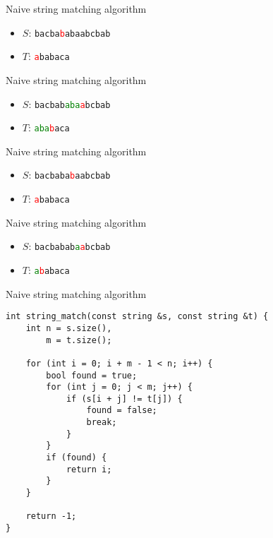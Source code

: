 \documentclass[12pt,t]{beamer}
\begin{document}
\begin{frame}{Naive string matching algorithm}
    \vspace{30pt}
    \begin{itemize}
        \item $S$: \texttt{bacba\textcolor{red}{b}abaabcbab}
        \item $T$: \texttt{\textcolor{red}{a}babaca}
    \end{itemize}
\end{frame}
\begin{frame}{Naive string matching algorithm}
    \vspace{30pt}
    \begin{itemize}
        \item $S$: \texttt{bacbab\textcolor{green}{aba}\textcolor{red}{a}bcbab}
        \item $T$: \texttt{\textcolor{green}{aba}\textcolor{red}{b}aca}
    \end{itemize}
\end{frame}
\begin{frame}{Naive string matching algorithm}
    \vspace{30pt}
    \begin{itemize}
        \item $S$: \texttt{bacbaba\textcolor{red}{b}aabcbab}
        \item $T$: \texttt{\textcolor{red}{a}babaca}
    \end{itemize}
\end{frame}
\begin{frame}{Naive string matching algorithm}
    \vspace{30pt}
    \begin{itemize}
        \item $S$: \texttt{bacbabab\textcolor{green}{a}\textcolor{red}{a}bcbab}
        \item $T$: \texttt{\textcolor{green}{a}\textcolor{red}{b}abaca}
    \end{itemize}
\end{frame}

\begin{frame}[fragile]{Naive string matching algorithm}
    \begin{verbatim}
int string_match(const string &s, const string &t) {
    int n = s.size(),
        m = t.size();

    for (int i = 0; i + m - 1 < n; i++) {
        bool found = true;
        for (int j = 0; j < m; j++) {
            if (s[i + j] != t[j]) {
                found = false;
                break;
            }
        }
        if (found) {
            return i;
        }
    }

    return -1;
}
    \end{verbatim}
\end{frame}
\end{document}
